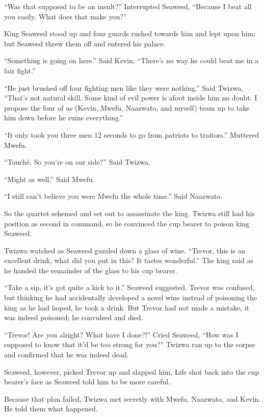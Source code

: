 ``Was that supposed to be an insult?'' Interrupted Seaweed, ``Because I beat all you easily. What does that make you?''

King Seaweed stood up and four guards rushed towards him and lept upon him; but Seaweed threw them off and entered his palace.

``Something is going on here.'' Said Kevin, ``There's no way he could beat me in a fair fight.''

``He just brushed off four fighting men like they were nothing.'' Said Twi\-zwa, ``That's not natural skill. Some kind of evil power is afoot inside him no doubt. I propose the four of us (Kevin, Mwe\-fu, Naa\-zwa\-to, and myself) team up to take him down before he ruins everything.''

``It only took you three men 12 seconds to go from patriots to traitors.'' Muttered Mwe\-fu.

``Touch\'{e}. So you're on our side?'' Said Twi\-zwa.

``Might as well.'' Said Mwe\-fu.

``I still can't believe you were Mwe\-fu the whole time.'' Said Naa\-zwa\-to.

\tbreak

So the quartet schemed and set out to assassinate the king.
Twi\-zwa still had his position as second in command, so he convinced the cup bearer to poison king Seaweed.

\tbreak

Twi\-zwa watched as Seaweed guzzled down a glass of wine. ``Trevor, this is an excellent drink, what did you put in this? It tastes wonderful.'' The king said as he handed the remainder of the glass to his cup bearer.

``Take a sip, it's got quite a kick to it.'' Seaweed suggested. Trevor was confused, but thinking he had accidentally developed a novel wine instead of poisoning the king as he had hoped, he took a drink. But Trevor had not made a mistake, it was indeed poisoned; he convulsed and died. 

``Trevor! Are you alright? What have I done?!'' Cried Seaweed, ``How was I supposed to know that it'd be too strong for you?'' Twi\-zwa ran up to the corpse and confirmed that he was indeed dead.

Seaweed, however, picked Trevor up and slapped him. Life shot back into the cup bearer's face as Seaweed told him to be more careful. 

Because that plan failed, Twi\-zwa met secretly with Mwe\-fu, Naa\-zwa\-to, and Kevin. He told them what happened.

